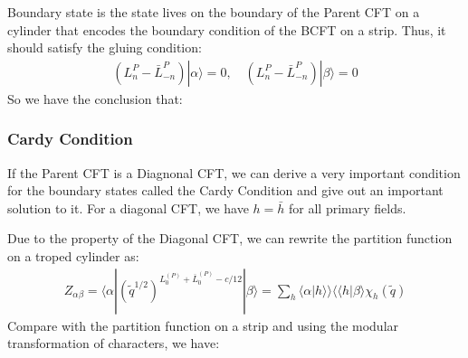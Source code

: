 Boundary state is the state lives on the boundary of the Parent CFT
on a cylinder that encodes the boundary condition of the BCFT on a
strip. Thus, it should satisfy the gluing condition:
\begin{align}
  (L_n^P - \bar{L}_{-n}^P) |\alpha \rangle = 0 , \quad (L_n^P -
  \bar{L}_{-n}^P) |\beta \rangle = 0
\end{align}
So we have the conclusion that:

\subsubsection{Cardy Condition}

If the Parent CFT is a Diagnonal CFT, we can derive a very important
condition for the boundary states called the Cardy Condition and give
out an important solution to it. For a diagonal CFT, we have $ h =
\bar{h} $ for all primary fields.

Due to the property of the Diagonal CFT, we can rewrite the partition
function on a troped cylinder as:
\begin{align}
  Z_{\alpha \beta} =
  \langle\alpha|(\tilde{q}^{1/2})^{L_{0}^{(P)}+\overline{L}_{0}^{(P)}-c/12}|\beta\rangle
  = \sum_h \langle\alpha|h\rangle\rangle \langle\langle
  h|\beta\rangle \chi_h(\tilde{q})
\end{align}
Compare with the partition function on a strip and using the modular
transformation of characters, we have:
